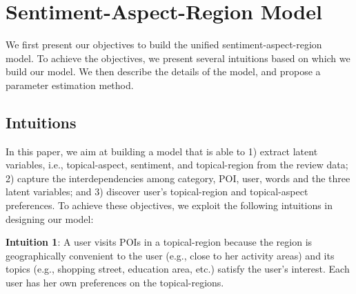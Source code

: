\section{Sentiment-Aspect-Region Model}
\label{sec:model}
We first present our objectives to build the
unified sentiment-aspect-region model.
To achieve the objectives, we present several intuitions
based on which we build our model.
We then describe the details of the model,
and propose a parameter estimation method.

\subsection{Intuitions}
\label{sec:motiv}

In this paper,
we aim at building a model that is able to 1) extract
latent variables, i.e., topical-aspect, sentiment,
and topical-region from the review
data; 2) capture the interdependencies among
category, POI, user, words and the three latent
variables; and 3) discover user's topical-region and
topical-aspect preferences.
To achieve these objectives,
we exploit the following intuitions in designing our model:

\textbf{Intuition 1}: A user visits POIs in a topical-region
because the region is geographically convenient to the user
(e.g., close to her activity areas) and its topics (e.g., shopping
street, education area, etc.) satisfy
the user's interest. Each user has her own preferences on the
topical-regions.

